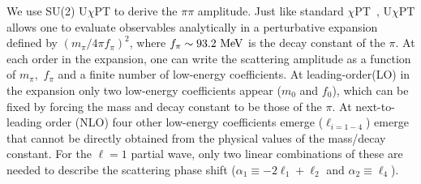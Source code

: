 \documentclass[twocolumn,hyperpdf,
amsmath,amssymb,
aps,prd,10pt,
superscriptaddress,nofootinbib,noeprint,preprintnumbers]{revtex4-1}
\begin{document}
We use SU(2) U$\chi$PT to derive the $\pi\pi$ amplitude. Just like standard $\chi$PT~\cite{Weinberg:1966kf, Colangelo:2001df,Ecker:1988te,Gasser:1984gg,Gasser:1983yg,Gasser:1983kx}, U$\chi$PT allows one to evaluate observables analytically in a perturbative expansion defined by $\left({m_\pi}/{4\pi f_\pi}\right)^2$, where $f_\pi\sim 93.2~\rm MeV$ is the decay constant of the $\pi$. At each order in the expansion, one can write the scattering amplitude as a function of $m_\pi,$ $f_\pi$ and a finite number of low-energy coefficients. At leading-order(LO) in the expansion only two low-energy coefficients appear ($m_0$ and $f_0$), which can be fixed by forcing the mass and decay constant to be those of the $\pi$. At next-to-leading order (NLO) four other low-energy coefficients emerge ($\ell_{i=1-4}$) emerge that cannot be directly obtained from the physical values of the mass/decay constant.  For the $\ell=1$ partial wave, only two linear combinations of these are needed to describe the scattering phase shift ($\alpha_1\equiv-2\ell_1+\ell_2$ and $\alpha_2\equiv\ell_4$). %

\end{document}
